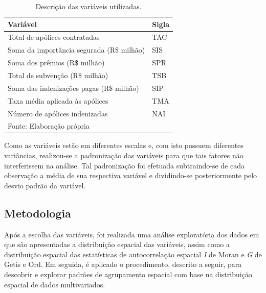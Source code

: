 \documentclass[
	12pt,				%
	openright,			%
	oneside,			%
	a4paper,			%
	chapter=TITLE,		%
	section=TITLE,		%
	english,			%
	french,				%
	spanish,			%
	brazil				%
	]{abntex2}
\begin{document}
\begin{table}[h!]
    \begin{center}
    \caption{Descrição das variáveis utilizadas.} \label{variaveis}
    \footnotesize
    \begin{tabular}{ll}
        \hline 
        Variável & Sigla  \tabularnewline
        \hline 
        Total de apólices contratadas                  & TAC       \\ %
        Soma da importância segurada (R\$ milhão)      & SIS       \\ %
        Soma dos prêmios (R\$ milhão)                  & SPR       \\ %
        Total de subvenção (R\$ milhão)                & TSB       \\ %
        Soma das indenizações pagas (R\$ milhão)       & SIP       \\ %
        Taxa média aplicada às apólices                & TMA       \\ %
        Número de apólices indenizadas                 & NAI       \\ %
        \hline 
        \vspace{0.1cm}
        \footnotesize{Fonte: Elaboração própria}
    \end{tabular}
    \end{center}
\end{table}
    
Como as variáveis estão em diferentes escalas e, com isto possuem diferentes variâncias, realizou-se a padronização das variáveis para que tais fatores não interferissem na análise. Tal padronização foi efetuada subtraindo-se de cada observação a média de sua respectiva variável e dividindo-se posteriormente pelo desvio padrão da variável.

\subsection{Metodologia}
    
Após a escolha das variáveis, foi realizada uma análise exploratória dos dados em que são apresentadas a distribuição espacial das variáveis, assim como a distribuição espacial das estatísticas de autocorrelação espacial \textit{I} de Moran e \textit{G} de Getis e Ord. Em seguida, é aplicado o procedimento, descrito a seguir, para descobrir e explorar padrões de agrupamento espacial com base na distribuição espacial de dados multivariados. 
\end{document}

